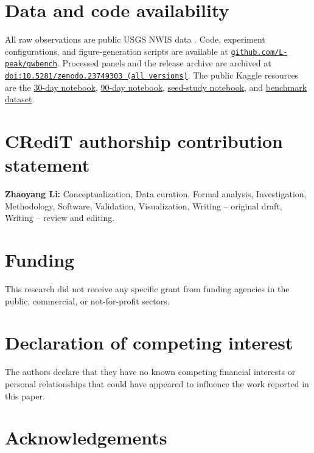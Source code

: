 \documentclass[preprint,12pt]{elsarticle}
\newcommand{\codeurl}{https://github.com/L-peak/gwbench}
\newcommand{\kaggleurl}{https://www.kaggle.com/code/kkksssaaalzy/gwbench-gru-h30}
\begin{document}
\section*{Data and code availability}

\begin{sloppypar}
All raw observations are public USGS NWIS data \citep{usgs2026}. Code,
experiment configurations, and figure-generation scripts are available at
\href{\codeurl}{\texttt{github.com/L-peak/gwbench}}. Processed panels and the
release archive are archived at
\href{https://doi.org/10.5281/zenodo.23749303}{\texttt{doi:10.5281/zenodo.23749303 (all versions)}}.
The public Kaggle resources are the
\href{\kaggleurl}{30-day notebook},
\href{https://www.kaggle.com/code/kkksssaaalzy/gwbench-gru-h90}{90-day notebook},
\href{https://www.kaggle.com/code/kkksssaaalzy/gwbench-seeds}{seed-study notebook},
and \href{https://www.kaggle.com/datasets/kkksssaaalzy/gwbench-data}{benchmark dataset}.
\end{sloppypar}

\section*{CRediT authorship contribution statement}

\textbf{Zhaoyang Li:} Conceptualization, Data curation, Formal analysis,
Investigation, Methodology, Software, Validation, Visualization, Writing --
original draft, Writing -- review and editing.

\section*{Funding}

This research did not receive any specific grant from funding agencies in the
public, commercial, or not-for-profit sectors.

\section*{Declaration of competing interest}

The authors declare that they have no known competing financial interests or
personal relationships that could have appeared to influence the work
reported in this paper.

\section*{Acknowledgements}
\end{document}
